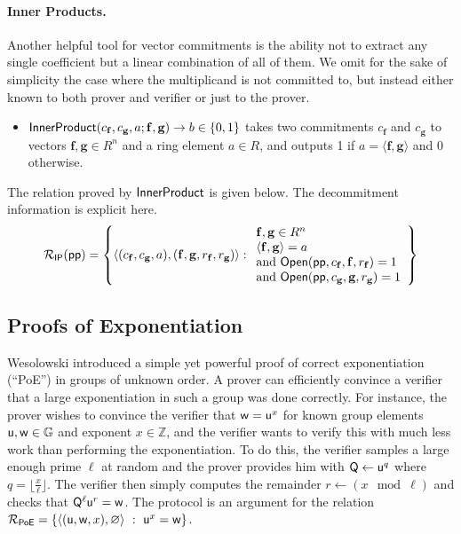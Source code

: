\documentclass{article}
\theoremstyle{definition}
\begin{document}
\fi 

\paragraph{Inner Products.} Another helpful tool for vector commitments is the ability not to extract any single coefficient but a linear combination of all of them. We omit for the sake of simplicity the case where the multiplicand is not committed to, but instead either known to both prover and verifier or just to the prover.
\begin{itemize}
    \item $\textsf{{InnerProduct}}(c_\mathbf{f}, c_\mathbf{g}, a; \mathbf{f}, \mathbf{g}) \rightarrow b \in \{0,1\}$ takes two commitments $c_\mathbf{f}$ and $c_\mathbf{g}$ to vectors $\mathbf{f}, \mathbf{g} \in R^n$ and a ring element $a \in R$, and outputs 1 if $a = \langle \mathbf{f}, \mathbf{g} \rangle$ and 0 otherwise.
\end{itemize}
The relation proved by $\textsf{{InnerProduct}}$ is given below. The decommitment information is explicit here.
\[ 
\mathcal{R_\textsf{IP}}(\textsf{pp}) = \left\{
\langle (c_\mathbf{f}, c_\mathbf{g}, a), (\mathbf{f}, \mathbf{g}, r_\mathbf{f}, r_\mathbf{g}) \rangle
: 
\begin{array}{l} 
\mathbf{f}, \mathbf{g} \in R^n \ \\
\langle \mathbf{f}, \mathbf{g} \rangle = a \\ 
 \text{and} \ \textsf{{Open}}(\textsf{pp}, c_\mathbf{f}, \mathbf{f}, r_\mathbf{f}) = 1 \\
 \text{and} \ \textsf{{Open}}(\textsf{pp}, c_\mathbf{g}, \mathbf{g}, r_\mathbf{g}) = 1 
\end{array}
\right\}
\]


\subsection{Proofs of Exponentiation}
Wesolowski \cite{EC:Wesolowski19} introduced a simple yet powerful proof of correct exponentiation (``PoE'') in groups of unknown order. A prover can efficiently convince a verifier that a large exponentiation in such a group was done correctly. For instance, the prover wishes to convince the verifier that $\mathsf{w} = \mathsf{u}^x$ for known group elements $\mathsf{u}, \mathsf{w} \in \mathbb{G}$ and exponent $x \in \mathbb{Z}$, and the verifier wants to verify this with much less work than performing the exponentiation. To do this, the verifier samples a large enough prime $\ell$ at random and the prover provides him with $\mathsf{Q} \gets \mathsf{u}^q$ where $q = \lfloor \frac{x}{\ell} \rfloor$. The verifier then simply computes the remainder $r \gets (x \mod \ell)$ and checks that $\mathsf{Q}^\ell\mathsf{u}^r = \mathsf{w}$. The protocol is an argument for the relation $\mathcal{R}_\mathsf{PoE} = \left\{ \langle(\mathsf{u}, \mathsf{w}, x), \varnothing\rangle \ : \ \mathsf{u}^x = \mathsf{w} \right\}$.
\end{document}
